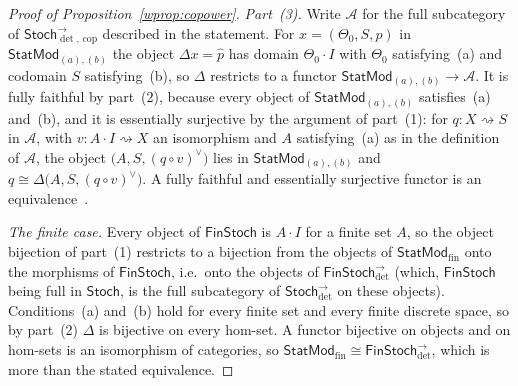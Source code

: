 \documentclass[11pt,a4paper]{article}
\theoremstyle{plain}
\theoremstyle{definition}
\theoremstyle{remark}
\newcommand{\cat}[1]{\mathsf{#1}}
\newcommand{\Stoch}{\cat{Stoch}}
\newcommand{\FinStoch}{\cat{FinStoch}}
\newcommand{\StatMod}{\cat{StatMod}}
\newcommand{\Jc}{\Delta}            %
\newcommand{\Arrdet}[1]{#1^{\rightarrow}_{\det}}
\newcommand{\Arrcop}[1]{#1^{\rightarrow}_{\det,\,\mathrm{cop}}}
\begin{document}
\begin{proof}[Proof of Proposition~\ref{wprop:copower}]
\emph{Part~(3).} Write $\mathcal A$ for the full subcategory of
$\Arrcop{\Stoch}$ described in the statement. For $x = (\Theta_0,S,p)$ in
$\StatMod_{(a),(b)}$ the object $\Jc x = \widehat p$ has domain
$\Theta_0 \cdot I$ with $\Theta_0$ satisfying~(a) and codomain $S$
satisfying~(b), so $\Jc$ restricts to a functor
$\StatMod_{(a),(b)} \to \mathcal A$. It is fully faithful by part~(2),
because every object of $\StatMod_{(a),(b)}$ satisfies~(a) and~(b), and it
is essentially surjective by the argument of part~(1): for
$q \colon X \rightsquigarrow S$ in $\mathcal A$, with
$v \colon A \cdot I \rightsquigarrow X$ an isomorphism and $A$
satisfying~(a) as in the definition of $\mathcal A$, the object
$\bigl(A,S,(q \circ v)^{\vee}\bigr)$ lies in $\StatMod_{(a),(b)}$ and
$q \cong \Jc\bigl(A,S,(q \circ v)^{\vee}\bigr)$. A fully faithful and
essentially surjective functor is an
equivalence~\cite[IV.4, Thm.~1(iii)]{maclane_categories_1998}.

\emph{The finite case.} Every object of $\FinStoch$ is $A \cdot I$ for a
finite set $A$, so the object bijection of part~(1) restricts to a
bijection from the objects of $\StatMod_{\mathrm{fin}}$ onto the morphisms of
$\FinStoch$, i.e.\ onto the objects of $\Arrdet{\FinStoch}$ (which, $\FinStoch$
being full in $\Stoch$, is the full subcategory of $\Arrdet{\Stoch}$ on these
objects). Conditions~(a) and~(b) hold for every finite set and every finite
discrete space, so by part~(2) $\Jc$ is bijective on every hom-set. A
functor bijective on objects and on hom-sets is an isomorphism of categories,
so $\StatMod_{\mathrm{fin}} \cong \Arrdet{\FinStoch}$, which is more than the
stated equivalence.
\end{proof}



\end{document}

